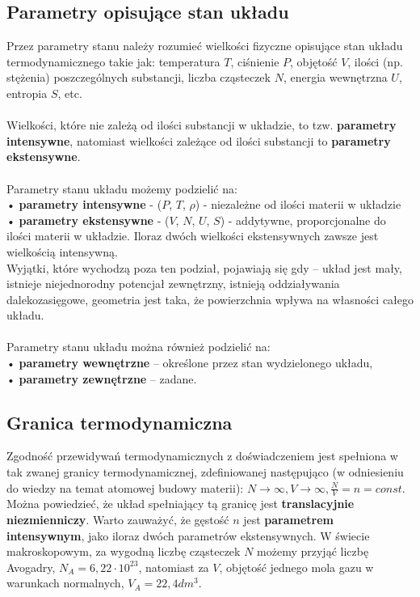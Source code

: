 \documentclass[12pt,a4paper,openright]{report} %
\begin{document}
\subsection{Parametry opisujące stan układu} 
Przez parametry stanu należy rozumieć wielkości fizyczne opisujące stan układu termodynamicznego takie jak: temperatura $T$, ciśnienie $P$, objętość $V$, ilości (np. stężenia) poszczególnych substancji, liczba cząsteczek $N$, energia wewnętrzna $U$, entropia $S$, etc. \\
\\
Wielkości, które nie zależą od ilości substancji w układzie, to tzw. \textbf{parametry intensywne}, natomiast wielkości zależące od ilości substancji to \textbf{parametry ekstensywne}. \\
\\
Parametry stanu układu możemy podzielić na:\\
• \textbf{parametry intensywne} - ($P$, $T$, $\rho$) - niezależne od ilości materii w układzie\\
• \textbf{parametry ekstensywne} - ($V$, $N$, $U$, $S$) - addytywne, proporcjonalne do ilości materii w układzie. Iloraz dwóch wielkości ekstensywnych zawsze jest wielkością intensywną. \\
Wyjątki, które wychodzą poza ten podział, pojawiają się gdy – układ jest mały, istnieje niejednorodny potencjał zewnętrzny, istnieją oddziaływania dalekozasięgowe, geometria jest taka, że powierzchnia wpływa na własności całego układu.\\
\\
Parametry stanu układu można również podzielić na:\\
• \textbf{parametry wewnętrzne} – określone przez stan wydzielonego układu,\\
• \textbf{parametry zewnętrzne} – zadane.\\
%
\subsection{Granica termodynamiczna} 
Zgodność przewidywań termodynamicznych z doświadczeniem jest spełniona w tak zwanej granicy termodynamicznej, zdefiniowanej następująco (w odniesieniu do wiedzy na temat atomowej budowy materii): $N \rightarrow \infty, V \rightarrow \infty, \frac{N}{V}=n=const.$\\
Można powiedzieć, że układ spełniający tą granicę jest \textbf{translacyjnie niezmienniczy}.
Warto zauważyć, że gęstość $n$ jest \textbf{parametrem intensywnym}, jako iloraz dwóch parametrów ekstensywnych.
W świecie makroskopowym, za wygodną liczbę cząsteczek $N$ możemy przyjąć liczbę Avogadry, $N_A=6,22 \cdot 10^{23}$, natomiast za $V$, objętość jednego mola gazu w warunkach normalnych, $V_A=22,4 dm^3$.
\end{document}

